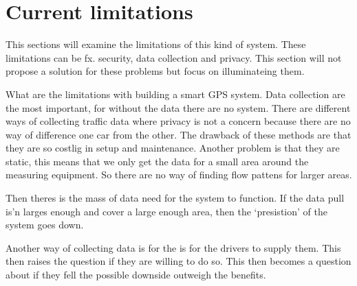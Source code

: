 \section{Current limitations}


This sections will examine the limitations of this kind of system. These limitations can be fx. security, data collection and privacy. This section will not propose a solution for these problems but focus on illuminateing them.
\newline

What are the limitations with building a smart GPS system. Data collection are the most important, for without the data there are no system. There are different ways of collecting traffic data where privacy is not a concern because there are no way of difference one car from the other. The drawback of these methods are that they are so costlig in setup and maintenance. Another problem is that they are static, this means that we only get the data for a small area around the measuring equipment. So there are no way of finding flow pattens for larger areas.

Then theres is the mass of data need for the system to function. If the data pull is'n larges enough and cover a large enough area, then the `presistion' of the system goes down.

Another way of collecting data is for the is for the drivers to supply them. This then raises the question if they are willing to do so. This then becomes a question about if they fell the possible downside outweigh the benefits.
